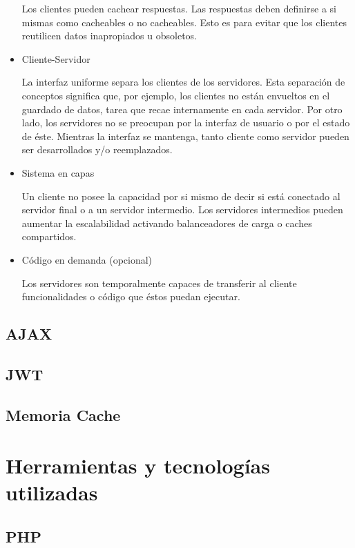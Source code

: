 \begin{itemize}
	Los clientes pueden cachear respuestas. Las respuestas deben definirse a si mismas 
	como cacheables o no cacheables. Esto es para evitar que los clientes reutilicen datos 
	inapropiados u obsoletos.
	
	\item Cliente-Servidor 
	
	La interfaz uniforme separa los clientes de los servidores. Esta separación de 
	conceptos significa que, por ejemplo, los clientes no están envueltos en el guardado 
	de datos, tarea que recae internamente en cada servidor. Por otro lado, los servidores
	no se preocupan por la interfaz de usuario o por el estado de éste. Mientras la 
	interfaz se mantenga, tanto cliente como servidor pueden ser desarrollados y/o 
	reemplazados.
	
	\item Sistema en capas
	
	Un cliente no posee la capacidad por si mismo de decir si está conectado al 
	servidor final o a un servidor intermedio. Los servidores intermedios pueden aumentar 
	la escalabilidad activando balanceadores de carga o caches compartidos.
	
	\item Código en demanda (opcional)
	
	Los servidores son temporalmente capaces de transferir al cliente funcionalidades o 
	código que éstos puedan ejecutar.

\end{itemize}

 
\subsection{AJAX}

\subsection{JWT}

\subsection{Memoria Cache}


\section{Herramientas y tecnologías utilizadas}

\subsection{PHP}

